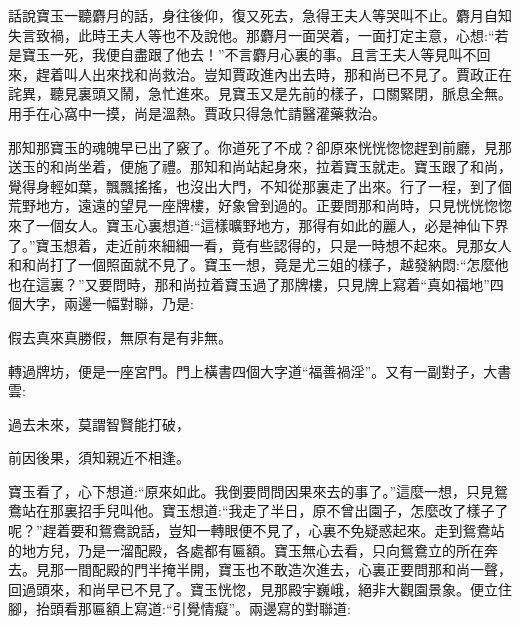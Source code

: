 


\begin{parag}
    話說寶玉一聽麝月的話，身往後仰，復又死去，急得王夫人等哭叫不止。麝月自知失言致禍，此時王夫人等也不及說他。那麝月一面哭着，一面打定主意，心想:“若是寶玉一死，我便自盡跟了他去！”不言麝月心裏的事。且言王夫人等見叫不回來，趕着叫人出來找和尚救治。豈知賈政進內出去時，那和尚已不見了。賈政正在詫異，聽見裏頭又鬧，急忙進來。見寶玉又是先前的樣子，口關緊閉，脈息全無。用手在心窩中一摸，尚是溫熱。賈政只得急忙請醫灌藥救治。
\end{parag}


\begin{parag}
    那知那寶玉的魂魄早已出了竅了。你道死了不成？卻原來恍恍惚惚趕到前廳，見那送玉的和尚坐着，便施了禮。那知和尚站起身來，拉着寶玉就走。寶玉跟了和尚，覺得身輕如葉，飄飄搖搖，也沒出大門，不知從那裏走了出來。行了一程，到了個荒野地方，遠遠的望見一座牌樓，好象曾到過的。正要問那和尚時，只見恍恍惚惚來了一個女人。寶玉心裏想道:“這樣曠野地方，那得有如此的麗人，必是神仙下界了。”寶玉想着，走近前來細細一看，竟有些認得的，只是一時想不起來。見那女人和和尚打了一個照面就不見了。寶玉一想，竟是尤三姐的樣子，越發納悶:“怎麼他也在這裏？”又要問時，那和尚拉着寶玉過了那牌樓，只見牌上寫着“真如福地”四個大字，兩邊一幅對聯，乃是:
\end{parag}


\begin{poem}
    \begin{pl}
        假去真來真勝假，無原有是有非無。
    \end{pl}
\end{poem}


\begin{parag}
    轉過牌坊，便是一座宮門。門上橫書四個大字道“福善禍淫”。又有一副對子，大書雲:
\end{parag}


\begin{poem}
    \begin{pl}
        過去未來，莫謂智賢能打破，
    \end{pl}


    \begin{pl}
        前因後果，須知親近不相逢。
    \end{pl}

\end{poem}


\begin{parag}
    寶玉看了，心下想道:“原來如此。我倒要問問因果來去的事了。”這麼一想，只見鴛鴦站在那裏招手兒叫他。寶玉想道:“我走了半日，原不曾出園子，怎麼改了樣子了呢？”趕着要和鴛鴦說話，豈知一轉眼便不見了，心裏不免疑惑起來。走到鴛鴦站的地方兒，乃是一溜配殿，各處都有匾額。寶玉無心去看，只向鴛鴦立的所在奔去。見那一間配殿的門半掩半開，寶玉也不敢造次進去，心裏正要問那和尚一聲，回過頭來，和尚早已不見了。寶玉恍惚，見那殿宇巍峨，絕非大觀園景象。便立住腳，抬頭看那匾額上寫道:“引覺情癡”。兩邊寫的對聯道:
\end{parag}

